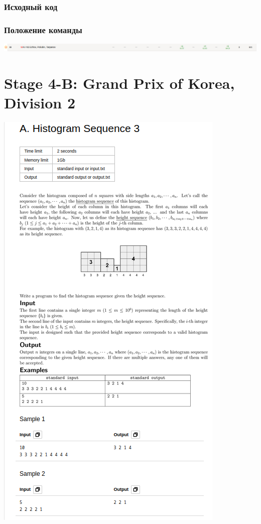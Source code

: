 \documentclass[12pt]{article}
\begin{document}
\subsubsection*{Исходный код}

\subsubsection*{Положение команды}
\includegraphics[scale=0.5]{images/3.png}\newline\noindent

\pagebreak
\section{Stage 4-B: Grand Prix of Korea, Division 2}
\includegraphics[scale=0.75]{statements/4_A.png}
\end{document}
